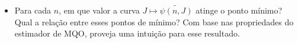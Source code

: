 \documentclass[10pt,a4paper]{article}
\begin{document}
\begin{itemize}
\begin{itemize}
 		$$\psi(n,J) = \mathbb{E}\left[\int(m(x) - \hat{b}_{n,J}'\boldsymbol{P}_{J}(x))^2\mathbb{P}_X(dx)\right]$$ por:
 		
 		$$\widetilde{\psi(n,J)} = \frac{1}{1000}\sum_{s=1}^{1000}\frac{1}{501}\sum_{i=0}^{500} \left(m\left(\frac{i}{500}\right) - P_J\left(\frac{i}{500}\right)'\hat{b}_{n,J}(s) \right)^2$$ 
 	\end{itemize}
 	Produza um gráfico em que, para cada valor de $n$, você esboce uma curva de como $\widetilde{\psi(n,J)}$ varia com $J$
 	
 	\item[d] Para cada $n$, em que valor a curva $J \mapsto \widetilde{\psi(n,J)}$ atinge o ponto mínimo? Qual a relação entre esses pontos de mínimo? Com base nas propriedades do estimador de MQO, proveja uma intuição para esse resultado.
 \end{itemize}
 
\end{document}
